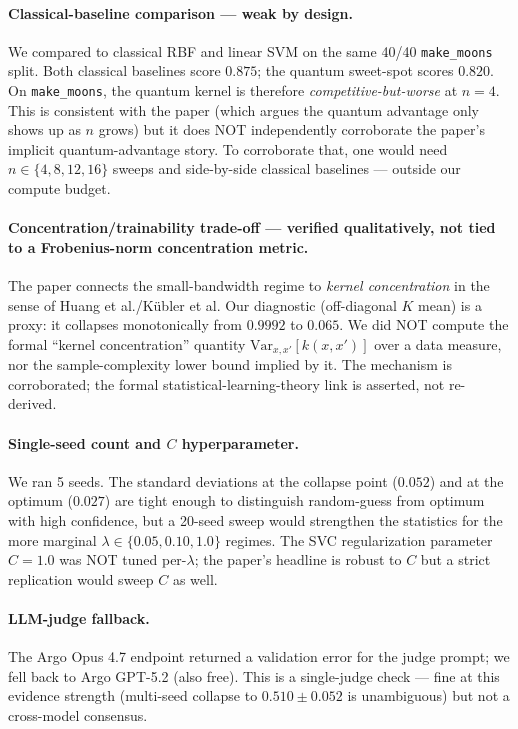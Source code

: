 \documentclass[11pt]{article}
\begin{document}
\paragraph{Classical-baseline comparison --- weak by design.}
We compared to classical RBF and linear SVM on the same 40/40 \texttt{make\_moons}
split. Both classical baselines score $0.875$; the quantum sweet-spot scores
$0.820$. On \texttt{make\_moons}, the quantum kernel is therefore
\emph{competitive-but-worse} at $n\!=\!4$. This is consistent with the paper
(which argues the quantum advantage only shows up as $n$ grows) but it does NOT
independently corroborate the paper's implicit quantum-advantage story. To
corroborate that, one would need $n \in \{4, 8, 12, 16\}$ sweeps and side-by-side
classical baselines --- outside our compute budget.

\paragraph{Concentration/trainability trade-off --- verified qualitatively, not tied to a Frobenius-norm concentration metric.}
The paper connects the small-bandwidth regime to \emph{kernel concentration}
in the sense of Huang et al./K\"ubler et al. Our diagnostic (off-diagonal $K$ mean)
is a proxy: it collapses monotonically from $0.9992$ to $0.065$. We did NOT
compute the formal ``kernel concentration'' quantity
$\mathrm{Var}_{x,x'}[k(x,x')]$ over a data measure, nor the sample-complexity
lower bound implied by it. The mechanism is corroborated; the formal
statistical-learning-theory link is asserted, not re-derived.

\paragraph{Single-seed count and $C$ hyperparameter.}
We ran 5 seeds. The standard deviations at the collapse point ($0.052$) and at
the optimum ($0.027$) are tight enough to distinguish random-guess from optimum
with high confidence, but a 20-seed sweep would strengthen the statistics for
the more marginal $\lambda \in \{0.05, 0.10, 1.0\}$ regimes. The SVC regularization
parameter $C\!=\!1.0$ was NOT tuned per-$\lambda$; the paper's headline is
robust to $C$ but a strict replication would sweep $C$ as well.

\paragraph{LLM-judge fallback.}
The Argo Opus 4.7 endpoint returned a validation error for the judge prompt;
we fell back to Argo GPT-5.2 (also free). This is a single-judge check --- fine
at this evidence strength (multi-seed collapse to $0.510 \pm 0.052$ is
unambiguous) but not a cross-model consensus.
\end{document}
